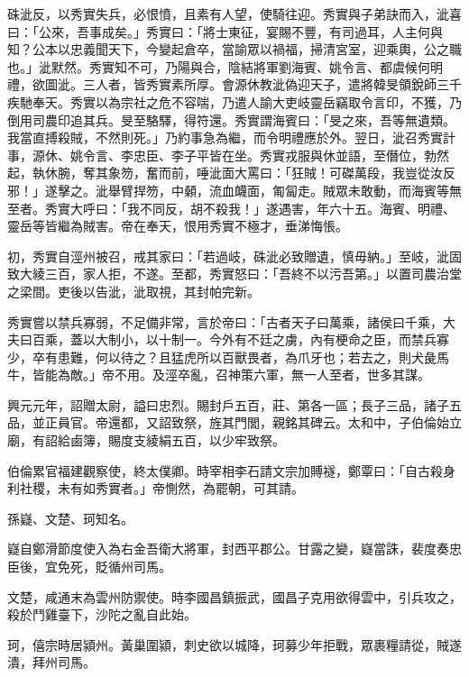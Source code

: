 \begin{pinyinscope}
 硃泚反，以秀實失兵，必恨憤，且素有人望，使騎往迎。秀實與子弟訣而入，泚喜曰：「公來，吾事成矣。」秀實曰：「將士東征，宴賜不豐，有司過耳，人主何與知？公本以忠義聞天下，今變起倉卒，當諭眾以禍福，掃清宮室，迎乘輿，公之職也。」泚默然。秀實知不可，乃陽與合，陰結將軍劉海賓、姚令言、都虞候何明禮，欲圖泚。三人者，皆秀實素所厚。會源休教泚偽迎天子，遣將韓旻領銳師三千疾馳奉天。秀實以為宗社之危不容喘，乃遣人諭大吏岐靈岳竊取令言印，不獲，乃倒用司農印追其兵。旻至駱驛，得符還。秀實謂海賓曰：「旻之來，吾等無遺類。我當直搏殺賊，不然則死。」乃約事急為繼，而令明禮應於外。翌日，泚召秀實計事，源休、姚令言、李忠臣、李子平皆在坐。秀實戎服與休並語，至僭位，勃然起，執休腕，奪其象笏，奮而前，唾泚面大罵曰：「狂賊！可磔萬段，我豈從汝反邪！」遂擊之。泚舉臂捍笏，中顙，流血衊面，匍匐走。賊眾未敢動，而海賓等無至者。秀實大呼曰：「我不同反，胡不殺我！」遂遇害，年六十五。海賓、明禮、靈岳等皆繼為賊害。帝在奉天，恨用秀實不極才，垂涕悔悵。



 初，秀實自涇州被召，戒其家曰：「若過岐，硃泚必致贈遺，慎毋納。」至岐，泚固致大綾三百，家人拒，不遂。至都，秀實怒曰：「吾終不以污吾第。」以置司農治堂之梁間。吏後以告泚，泚取視，其封帕完新。



 秀實嘗以禁兵寡弱，不足備非常，言於帝曰：「古者天子曰萬乘，諸侯曰千乘，大夫曰百乘，蓋以大制小，以十制一。今外有不廷之虜，內有梗命之臣，而禁兵寡少，卒有患難，何以待之？且猛虎所以百獸畏者，為爪牙也；若去之，則犬彘馬牛，皆能為敵。」帝不用。及涇卒亂，召神策六軍，無一人至者，世多其謀。



 興元元年，詔贈太尉，謚曰忠烈。賜封戶五百，莊、第各一區；長子三品，諸子五品，並正員官。帝還都，又詔致祭，旌其門閭，親銘其碑云。太和中，子伯倫始立廟，有詔給鹵簿，賜度支綾絹五百，以少牢致祭。



 伯倫累官福建觀察使，終太僕卿。時宰相李石請文宗加賻襚，鄭覃曰：「自古殺身利社稷，未有如秀實者。」帝惻然，為罷朝，可其請。



 孫嶷、文楚、珂知名。



 嶷自鄭滑節度使入為右金吾衛大將軍，封西平郡公。甘露之變，嶷當誅，裴度奏忠臣後，宜免死，貶循州司馬。



 文楚，咸通末為雲州防禦使。時李國昌鎮振武，國昌子克用欲得雲中，引兵攻之，殺於鬥雞臺下，沙陀之亂自此始。



 珂，僖宗時居潁州。黃巢圍潁，刺史欲以城降，珂募少年拒戰，眾裹糧請從，賊遂潰，拜州司馬。




\end{pinyinscope}
